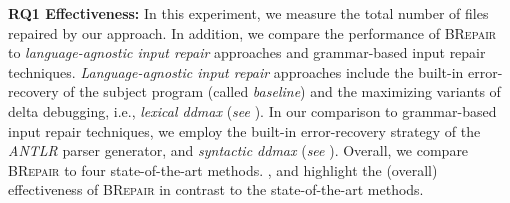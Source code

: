\documentclass[sigconf,review,anonymous]{acmart}
\newcounter{todocounter}
\newcommand{\todo}[1]{\marginpar{$|$}\textcolor{red}{\stepcounter{todocounter}\footnote[\thetodocounter]{\textcolor{red}{\textbf{TODO }}\textit{#1}}}}
\newcommand{\recheck}[1]{\textcolor{red}{#1}}
\renewcommand{\todo}[1]{}
\newcommand{\approach}{\textsc{BRepair}\xspace}
\begin{document}
\noindent
\textbf{RQ1 Effectiveness:} 
In this experiment,
we measure the total number of files repaired by our approach. In addition, we compare 
the performance of \approach to 
\textit{language-agnostic input repair} approaches and grammar-based input repair techniques. 
\textit{Language-agnostic input repair} approaches  include the built-in error-recovery of the subject program (called \textit{baseline}) and the maximizing variants of delta debugging, i.e., \textit{lexical ddmax} (\textit{see}  ). 
In our comparison to grammar-based input repair techniques, we employ the built-in error-recovery strategy of the \textit{ANTLR} parser generator, and \textit{syntactic ddmax}  (\textit{see}  ). 
Overall, we compare \approach to four state-of-the-art methods. 
,   and  highlight the (overall) effectiveness of \approach in contrast to the state-of-the-art methods. 


\end{document}
